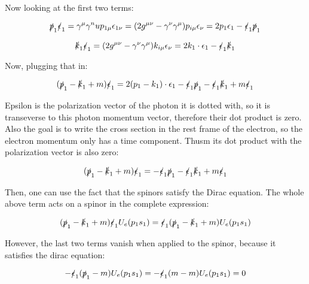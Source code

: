 \documentclass[a4]{article}
\begin{document}
    Now looking at the first two terms:

    \begin{equation}
        \slashed{p}_1 \slashed{\epsilon}_1 = \gamma^\mu \gamma^nu p_{1 \mu} \epsilon_{1 \nu} = (2 g^{\mu \nu} - \gamma^\nu \gamma^\mu) p_{i \mu} \epsilon_\nu = 2 p_1 \epsilon_1 - \slashed{\epsilon}_1 \slashed{p}_1
    \end{equation}

    \begin{equation}
        \slashed{k}_1 \slashed{\epsilon}_1 = (2 g^{\mu \nu} - \gamma^\nu \gamma^\mu) k_{i \mu} \epsilon_\nu = 2 k_1 \cdot \epsilon_1 - \slashed{\epsilon}_1 \slashed{k}_1
    \end{equation}

    Now, plugging that in:

    \begin{equation}
        (\slashed{p}_1 - \slashed{k}_1 + m) \slashed{\epsilon}_1 = 2 (p_1 - k_1) \cdot \epsilon_1 - \slashed{\epsilon}_1 \slashed{p}_1 - \slashed{\epsilon}_1 \slashed{k}_1 + m \slashed{\epsilon}_1
    \end{equation}

    Epsilon is the polarization vector of the photon it is dotted with, so it is transeverse to this photon momentum vector, therefore their dot product is zero. Also the goal is to write the cross section in the rest frame of the electron, so the electron momentum only
    has a time component. Thusm its dot product with the polarization vector is also zero:

    \begin{equation}
        (\slashed{p}_1 - \slashed{k}_1 + m) \slashed{\epsilon}_1 = - \slashed{\epsilon}_1 \slashed{p}_1 - \slashed{\epsilon}_1 \slashed{k}_1 + m \slashed{\epsilon}_1
    \end{equation}

    Then, one can use the fact that the spinors satisfy the Dirac equation. The whole above term acts on a spinor in the complete expression:

    \begin{equation}
        (\slashed{p}_1 - \slashed{k}_1 + m) \slashed{\epsilon}_1 U_e (p_1 s_1) = \slashed{\epsilon}_1 (\slashed{p}_1 - \slashed{k}_1 + m) U_e (p_1 s_1)
    \end{equation}

    However, the last two terms vanish when applied to the spinor, because it satisfies the dirac equation:

    \begin{equation}
        - \slashed{\epsilon}_1 (\slashed{p}_1 - m) U_e (p_1 s_1) = - \slashed{\epsilon}_1 (m - m) U_e (p_1 s_1) = 0
    \end{equation}
\end{document}
